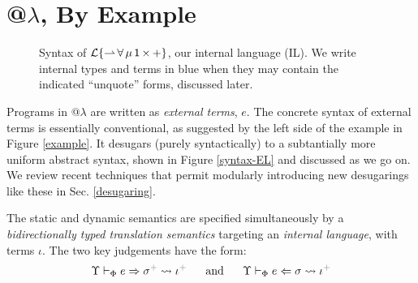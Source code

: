 \documentclass[9pt,preprint]{sigplanconf}
\newcommand{\moutput}{^{\color{gray}{+}}}
\begin{document}
\section{@$\lambda$, By Example}\label{overview}

\begin{figure}
\small
\hspace{-5px}
\caption{Syntax of {$\mathcal{L}\{{\rightharpoonup}\,{\forall}\,{\mu}\,{{\sf 1}}\,{\times}\,{+}\}$}, our internal language (IL). We write internal types and terms in blue when they may contain the indicated ``unquote'' forms, discussed later.}
\label{syntax-IL}
\end{figure}


Programs in @$\lambda$ are written as \emph{external terms}, $e$. The concrete syntax of external terms is essentially conventional, as suggested by the left side of the example in Figure \ref{example}. It desugars (purely syntactically) to a subtantially more uniform abstract syntax, shown in Figure \ref{syntax-EL} and discussed as we go on. We review recent techniques that permit modularly introducing new desugarings like these in Sec. \ref{desugaring}. 

The static and dynamic semantics are specified simultaneously by a \emph{bidirectionally typed translation semantics} targeting an \emph{internal language}, with terms $\iota$. The two key judgements have the form:  \[\esynX{e}{\st\moutput}{\iota\moutput} ~~~~~\text{and}~~~~~ \eanaX{e}{\st}{\iota\moutput}\]
\noindent
\end{document}
